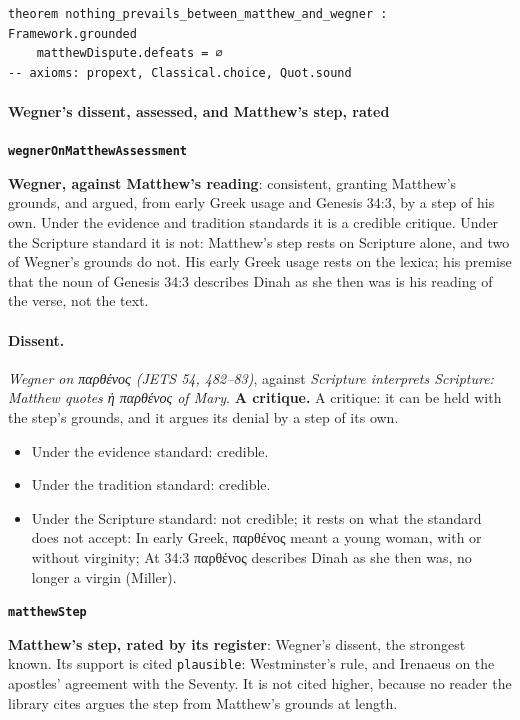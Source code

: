 \documentclass[11pt]{article}
\begin{document}
{\small\begin{verbatim}
theorem nothing_prevails_between_matthew_and_wegner : Framework.grounded
    matthewDispute.defeats = ∅
-- axioms: propext, Classical.choice, Quot.sound
\end{verbatim}}
\paragraph*{Wegner’s dissent, assessed, and Matthew’s step, rated}
\leavevmode\par\nobreak
\par\medskip\noindent\textbf{\texttt{wegner\allowbreak{}On\allowbreak{}Matthew\allowbreak{}Assessment}}\par\nobreak\noindent
\textbf{Wegner, against Matthew’s reading}: consistent, granting Matthew’s grounds, and argued, from early Greek usage and Genesis 34:3, by a step of his own. Under the evidence and tradition standards it is a credible critique. Under the Scripture standard it is not: Matthew’s step rests on Scripture alone, and two of Wegner’s grounds do not. His early Greek usage rests on the lexica; his premise that the noun of Genesis 34:3 describes Dinah as she then was is his reading of the verse, not the text.

\paragraph{Dissent.} \emph{Wegner on παρθένος (JETS 54, 482–83)}, against \emph{Scripture interprets Scripture: Matthew quotes ἡ παρθένος of Mary}. \textbf{A critique.} A critique: it can be held with the step’s grounds, and it argues its denial by a step of its own.
\begin{itemize}
\item Under the evidence standard: credible.
\item Under the tradition standard: credible.
\item Under the Scripture standard: not credible; it rests on what the standard does not accept: In early Greek, παρθένος meant a young woman, with or without virginity; At 34:3 παρθένος describes Dinah as she then was, no longer a virgin (Miller).
\end{itemize}
\par\medskip\noindent\textbf{\texttt{matthew\allowbreak{}Step}}\par\nobreak\noindent
\textbf{Matthew’s step, rated by its register}: Wegner’s dissent, the strongest known. Its support is cited \texttt{plausible}: Westminster’s rule, and Irenaeus on the apostles’ agreement with the Seventy. It is not cited higher, because no reader the library cites argues the step from Matthew’s grounds at length.
\end{document}
